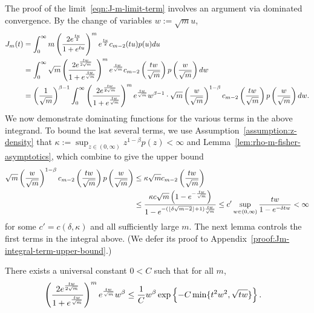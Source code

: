 The proof of the limit~\eqref{eqn:J-m-limit-term} involves
an argument via dominated convergence.
By the change of variables $w := \sqrt{m} u$,
\begin{align*}
	 J_m(t) & =  \int_0^\infty m \left({\frac{2e^{\frac{tu}{2}}}{1 + e^{tu}}}\right)^{m} e^{\frac{tu}{2}} c_{m-2}(tu) p(u) du \nonumber \\
	 & =  \int_0^\infty \sqrt{m} \left({\frac{2e^{\frac{tw}{2\sqrt{m}}}}{1 + e^{\frac{tw}{\sqrt{m}}}}}\right)^{m} e^{\frac{tw}{\sqrt{m}}} c_{m-2}\left({\frac{tw}{\sqrt{m}}}\right) p \left({\frac{w}{\sqrt{m}}}\right) dw \nonumber  \\
	 & = \left({\frac{1}{\sqrt{m}}}\right)^{\beta-1} \int_0^\infty \left({\frac{2e^{\frac{tw}{2\sqrt{m}}}}{1 + e^{\frac{tw}{\sqrt{m}}}}}\right)^{m} e^{\frac{tw}{\sqrt{m}}} w^{\beta-1} \cdot \sqrt{m}  \left({\frac{w}{\sqrt{m}}}\right)^{1-\beta} c_{m-2}\left({\frac{tw}{\sqrt{m}}}\right) p \left({\frac{w}{\sqrt{m}}}\right) dw.
\end{align*}
We now demonstrate dominating functions for the various terms in the above
integrand. To bound the lsat several terms,
we use Assumption~\ref{assumption:z-density} that $\kappa := \sup_{z
  \in (0, \infty)} z^{1-\beta} p(z) < \infty$ and
Lemma~\ref{lem:rho-m-fisher-asymptotics}, which combine
to give the upper bound
\begin{align*}
  \sqrt{m}  \left({\frac{w}{\sqrt{m}}}\right)^{1-\beta} c_{m-2}\left({\frac{tw}{\sqrt{m}}}\right) p \left({\frac{w}{\sqrt{m}}}\right)
  & \leq  \kappa  \sqrt{m} c_{m-2} \left({\frac{tw}{\sqrt{m}}}\right) \\
  & \leq  \frac{\kappa  c\sqrt{m}\left({1 - e^{-\frac{tw}{\sqrt{m}}}}\right)}{1 - e^{-(\lfloor \delta \sqrt{m-2} \rfloor + 1) \frac{tw}{\sqrt{m}}}}
  \leq c' \sup_{w \in (0, \infty)} \frac{ tw}{1 - e^{-\delta tw}} < \infty
\end{align*}
for some $c' = c(\delta, \kappa)$ and all sufficiently large $m$.  The next
lemma controls the first terms in the integral above. (We defer its proof to
Appendix~\ref{proof:Jm-integral-term-upper-bound}.)
\begin{lemma} \label{lem:Jm-integral-term-upper-bound}
  There exists a universal constant $0 < C$ such that for all $m$,
  \begin{align*}
    \left({\frac{2e^{\frac{tw}{2\sqrt{m}}}}{1 + e^{\frac{tw}{\sqrt{m}}}}}\right)^{m} e^{\frac{tw}{\sqrt{m}}} w^\beta   & \leq \frac{1}{C}
    w^\beta \exp \left\{{-C \min \{t^2w^2, \sqrt{tw}\}}\right\}.
  \end{align*}
\end{lemma}


